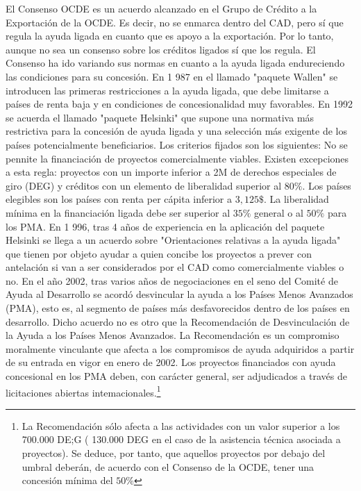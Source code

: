 \documentclass[10pt,a4paper]{article}
\begin{document}
El Consenso OCDE es un acuerdo alcanzado en el Grupo de Crédito a la Exportación de la OCDE. Es decir, no se enmarca dentro del CAD, pero sí que regula la ayuda ligada en cuanto que es apoyo a la exportación. Por lo tanto, aunque no sea un consenso sobre los créditos ligados sí que los regula. El Consenso ha ido variando sus normas en cuanto a la ayuda ligada endureciendo las condiciones para su concesión. En 1 987 en el llamado "paquete Wallen" se introducen las primeras restricciones a la ayuda ligada, que debe limitarse a países de renta baja y en condiciones de concesionalidad muy favorables. En 1992 se acuerda el llamado "paquete Helsinki" que supone una normativa más restrictiva para la concesión de ayuda ligada y una selección más exigente de los países potencialmente beneficiarios. Los criterios fijados son los siguientes: No se pennite la financiación de proyectos comercialmente viables. Existen excepciones a esta regla: proyectos con un importe inferior a 2M de derechos especiales de giro (DEG) y créditos con un elemento de liberalidad superior al $80\%$. Los países elegibles son los países con renta per cápita inferior a $3,125\$$. La liberalidad mínima en la financiación ligada debe ser superior al $35\%$ general o al $50\%$ para los PMA. En 1 996, tras 4 años de experiencia en la aplicación del paquete Helsinki se llega a un acuerdo sobre "Orientaciones relativas a la ayuda ligada" que tienen por objeto ayudar a quien concibe los proyectos a prever con antelación si van a ser considerados por el CAD como comercialmente viables o no. En el año 2002, tras varios años de negociaciones en el seno del Comité de Ayuda al Desarrollo se acordó desvincular la ayuda a los Países Menos Avanzados (PMA), esto es, al segmento de países más desfavorecidos dentro de los países en desarrollo. Dicho acuerdo no es otro que la Recomendación de Desvinculación de la Ayuda a los Países Menos Avanzados. La Recomendación es un compromiso moralmente vinculante que afecta a los compromisos de ayuda adquiridos a partir de su entrada en vigor en enero de 2002. Los proyectos financiados con ayuda concesional en los PMA deben, con carácter general, ser adjudicados a través de licitaciones abiertas intemacionales.\footnote{%
    La Recomendación sólo afecta a las actividades con un valor superior a los 700.000 DE;G ( 130.000 DEG en el caso de la asistencia técnica asociada a proyectos). Se deduce, por tanto, que aquellos proyectos por debajo del umbral deberán, de acuerdo con el Consenso de la OCDE, tener una concesión mínima del $50\%$
}
\end{document}
